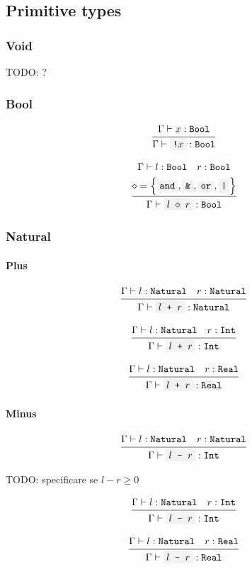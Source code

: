 \documentclass[11pt]{report}
\newcommand{\set}[1]{\left\{#1\right\}}
\newcommand{\infrule}[3][gathered]{\frac{\begin{#1}#2\end{#1}}{\begin{gathered}#3\end{gathered}}}
\newcommand{\then}{\vdash}
\newcommand{\code}[1]{\texttt{\colorbox{gray!10}{#1}}}
\newcommand{\bop}{\diamond}
\newcommand{\Bool}{\texttt{Bool}}
\newcommand{\Int}{\texttt{Int}}
\newcommand{\Natural}{\texttt{Natural}}
\newcommand{\Real}{\texttt{Real}}
\newcommand{\Env}{\Gamma}
\theoremstyle{definition}
\newcommand{\comment}[1]{
	\parbox{0.9\linewidth}{\color{black!30}\small\sffamily #1}
}
\begin{document}
\newpage

\subsection{Primitive types}

\subsubsection{Void}

\comment{TODO: ?}

\subsubsection{Bool}

\[
	\infrule{
		\Env\then x:\Bool
	}{
		\Env\then \code{!$x$}:\Bool
	}
\]

\[
	\infrule{
		\Env\then l:\Bool \quad r:\Bool \\*
		\bop = \set{\code{and}, \code{\&}, \code{or}, \code{|}}
	}{
		\Env\then \code{$l$ $\bop$ $r$}:\Bool
	}
\]

\subsubsection{Natural}

\paragraph{Plus}

\[
	\infrule{
		\Env\then l:\Natural \quad r:\Natural
	}{
		\Env\then \code{$l$ + $r$} : \Natural
	}
\]

\[
	\infrule{
		\Env\then l:\Natural \quad r:\Int
	}{
		\Env\then \code{$l$ + $r$} : \Int
	}
\]

\[
	\infrule{
		\Env\then l:\Natural \quad r:\Real
	}{
		\Env\then \code{$l$ + $r$} : \Real
	}
\]

\paragraph{Minus}

\[
	\infrule{
		\Env\then l:\Natural \quad r:\Natural
	}{
		\Env\then \code{$l$ - $r$} : \Int
	}
\]

\comment{TODO: specificare se $l-r\geq0$}

\[
	\infrule{
		\Env\then l:\Natural \quad r:\Int
	}{
		\Env\then \code{$l$ - $r$} : \Int
	}
\]

\[
	\infrule{
		\Env\then l:\Natural \quad r:\Real
	}{
		\Env\then \code{$l$ - $r$} : \Real
	}
\]
\end{document}
